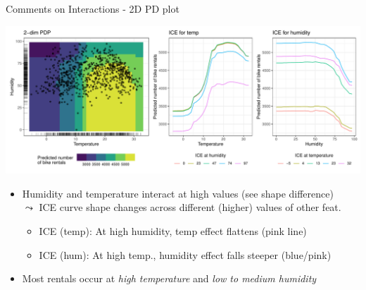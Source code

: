 \documentclass[10pt,compress,t,notes=noshow, xcolor=table]{beamer}
\begin{document}
\begin{frame}{Comments on Interactions - 2D PD plot}

\begin{center}
\includegraphics[width=\textwidth]{figure/pdp2d_bike}
\end{center}

\begin{itemize}
 \item Humidity and temperature interact at high values (see shape difference)\\
 $\leadsto$ ICE curve shape changes across different (higher) values of other feat.%
  \begin{itemize}
    \item ICE (temp): At high humidity, temp effect flattens (pink line)
    \item ICE (hum): At high temp., humidity effect falls steeper (blue/pink)
  \end{itemize}

 \item Most rentals occur at \textit{high temperature} and \textit{low to medium humidity}
\end{itemize}


%

\end{frame}
\end{document}
